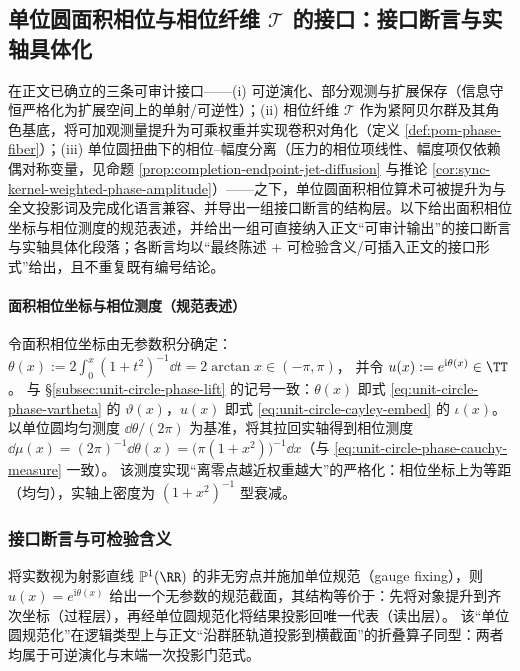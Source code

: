 
\subsection{单位圆面积相位与相位纤维 \(\mathcal{T}\) 的接口：接口断言与实轴具体化}\label{subsec:unit-circle-phase-T-interface}
在正文已确立的三条可审计接口——(i) 可逆演化、部分观测与扩展保存（信息守恒严格化为扩展空间上的单射/可逆性）；(ii) 相位纤维 \(\mathcal{T}\) 作为紧阿贝尔群及其角色基底，将可加观测量提升为可乘权重并实现卷积对角化（定义 \ref{def:pom-phase-fiber}）；(iii) 单位圆扭曲下的相位–幅度分离（压力的相位项线性、幅度项仅依赖偶对称变量，见命题 \ref{prop:completion-endpoint-jet-diffusion} 与推论 \ref{cor:sync-kernel-weighted-phase-amplitude}）——之下，单位圆面积相位算术可被提升为与全文投影词及完成化语言兼容、并导出一组接口断言的结构层。以下给出面积相位坐标与相位测度的规范表述，并给出一组可直接纳入正文“可审计输出”的接口断言与实轴具体化段落；各断言均以“最终陈述 + 可检验含义/可插入正文的接口形式”给出，且不重复既有编号结论。

\paragraph{面积相位坐标与相位测度（规范表述）}
令面积相位坐标由无参数积分确定：
\(\theta(x):=2\int_{0}^{x}(1+t^{2})^{-1}\dd t=2\arctan x\in(-\pi,\pi)\)，
并令 \(u(x):=e^{\mathrm{i}\theta(x)}\in\TT\)。
与 \S\ref{subsec:unit-circle-phase-lift} 的记号一致：\(\theta(x)\) 即式 \eqref{eq:unit-circle-phase-vartheta} 的 \(\vartheta(x)\)，\(u(x)\) 即式 \eqref{eq:unit-circle-cayley-embed} 的 \(\iota(x)\)。
以单位圆均匀测度 \(\dd\theta/(2\pi)\) 为基准，将其拉回实轴得到相位测度
\(\dd\mu(x)=(2\pi)^{-1}\dd\theta(x)=\bigl(\pi(1+x^{2})\bigr)^{-1}\dd x\)（与 \eqref{eq:unit-circle-phase-cauchy-measure} 一致）。
该测度实现“离零点越近权重越大”的严格化：相位坐标上为等距（均匀），实轴上密度为 \((1+x^{2})^{-1}\) 型衰减。

\subsubsection{接口断言与可检验含义}

\begin{proposition}[射影直线的单位圆规约与投影门同构]\label{prop:phase-projection-gate-isomorphism}
将实数视为射影直线 \(\mathbb{P}^{1}(\RR)\) 的非无穷点并施加单位规范（gauge fixing），则 \(u(x)=e^{\mathrm{i}\theta(x)}\) 给出一个无参数的规范截面，其结构等价于：先将对象提升到齐次坐标（过程层），再经单位圆规范化将结果投影回唯一代表（读出层）。
该“单位圆规范化”在逻辑类型上与正文“沿群胚轨道投影到横截面”的折叠算子同型：两者均属于可逆演化与末端一次投影门范式。
\end{proposition}

